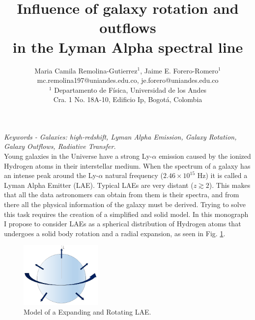 \documentclass[11pt,a4paper]{article}
\begin{document}
\thispagestyle{empty}

\title{\textbf{Influence of galaxy rotation and outflows \\
			   in the Lyman Alpha spectral line}}
		
\author{Maria Camila Remolina-Gutierrez$^1$, Jaime E. Forero-Romero$^1$\\ \vspace{3mm}
	    mc.remolina197@uniandes.edu.co, \hspace{0.8mm} je.forero@uniandes.edu.co\\ 
		$^1$ Departamento de F\'{i}sica, Universidad de los Andes \\
		Cra. 1 No. 18A-10, Edificio Ip, Bogot\'a, Colombia}
\date{} %
\maketitle\thispagestyle{empty} %
\textit{Keywords - Galaxies: high-redshift, Lyman Alpha Emission, Galaxy Rotation, Galaxy Outflows, Radiative Transfer.}\\

Young galaxies in the Universe have a strong Ly-$\alpha$ emission caused by the ionized Hydrogen atoms in their interstellar medium. When the spectrum of a galaxy has an intense peak around the Ly-$\alpha$ natural frequency ($2.46\times 10^{15}$ Hz) it is called a Lyman Alpha Emitter (LAE). Typical LAEs are very distant ($z \gtrsim 2$). This makes that all the data astronomers can obtain from them is their spectra, and from there all the physical information of the galaxy must be derived. Trying to solve this task requires the creation of a simplified and solid model. In this monograph I propose to consider LAEs as a spherical distribution of Hydrogen atoms that undergoes a solid body rotation and a radial expansion, as seen in Fig. \ref{model}. 

\begin{figure}[h]
	\centerline{\includegraphics[width=4cm]{model.png}}
	\caption{Model of a Expanding and Rotating LAE.}
	\label{model}
\end{figure}
\end{document}
